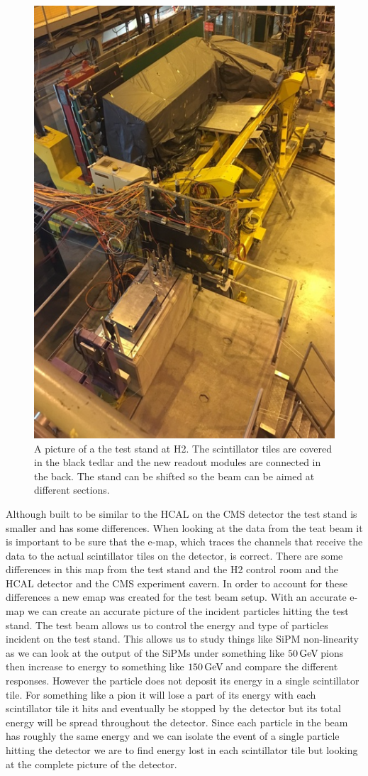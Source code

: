 \begin{figure}
\centering
\includegraphics[width=0.4\linewidth]{Figures/Teststand.png}
\caption{A picture of a the test stand at H2. The scintillator tiles are covered in the black tedlar and the new readout modules are connected in the back. The stand can be shifted so the beam can be aimed at different sections.}
\label{fig:stand}
\end{figure}


Although built to be similar to the HCAL on the CMS detector the test stand is smaller and has some differences. When looking at the data from the teat beam it is important to be sure that the e-map, which traces the channels that receive the data to the actual scintillator tiles on the detector, is correct. There are some differences in this map from the test stand and the H2 control room and the HCAL detector and the CMS experiment cavern. In order to account for these differences a new emap was created for the test beam setup. With an accurate e-map we can create an accurate picture of the incident particles hitting the test stand. The test beam allows us to control the energy and type of particles incident on the test stand. This allows us to study things like SiPM non-linearity as we can look at the output of the SiPMs under something like $50 {\,\text{Ge\hspace{-.08em}V\hspace{-0.16em}}}$ pions then increase to energy to something like $150 {\,\text{Ge\hspace{-.08em}V\hspace{-0.16em}}}$ and compare the different responses. However the particle does not deposit its energy in a single scintillator tile. For something like a pion it will lose a part of its energy with each scintillator tile it hits and eventually be stopped by the detector but its total energy will be spread throughout the detector. Since each particle in the beam has roughly the same energy and we can isolate the event of a single particle hitting the detector we are to find energy lost in each scintillator tile but looking at the complete picture of the detector. 

